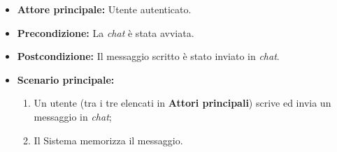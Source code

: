 \label{usecase:Invio messaggio chat}
\begin{itemize}
	\item \textbf{Attore principale:} Utente autenticato.

	\item \textbf{Precondizione:} La \textit{chat} è stata avviata.


	\item \textbf{Postcondizione:} Il messaggio scritto è stato inviato in \textit{chat}.

	\item \textbf{Scenario principale:}
            \begin{enumerate}
                \item Un utente (tra i tre elencati in \textbf{Attori principali}) scrive ed invia un messaggio in \textit{chat};
                \item Il Sistema memorizza il messaggio.
	      \end{enumerate}
\end{itemize}